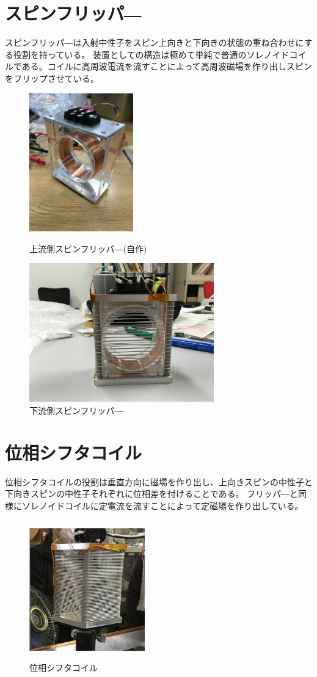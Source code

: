 \section{スピンフリッパ―}
スピンフリッパ―は入射中性子をスピン上向きと下向きの状態の重ね合わせにする役割を持っている。
装置としての構造は極めて単純で普通のソレノイドコイルである。コイルに高周波電流を流すことによって高周波磁場を作り出しスピンをフリップさせている。
\begin{figure}[H]
\begin{minipage}{0.5\hsize}
\centering
\includegraphics[height=6cm]{device/flipperphoto1.jpg}\caption{上流側スピンフリッパ―(自作)}
\end{minipage}
\begin{minipage}{0.5\hsize}
\centering
\includegraphics[height=6cm]{device/flipperphoto2.jpg}\caption{下流側スピンフリッパ―}
\end{minipage}
\end{figure}


\section{位相シフタコイル}
位相シフタコイルの役割は垂直方向に磁場を作り出し、上向きスピンの中性子と下向きスピンの中性子それぞれに位相差を付けることである。
フリッパ―と同様にソレノイドコイルに定電流を流すことによって定磁場を作り出している。
\begin{figure}[H]
\centering
\includegraphics[width=5cm,height=6cm]{device/shifterphoto.pdf}\caption{位相シフタコイル}
\end{figure}